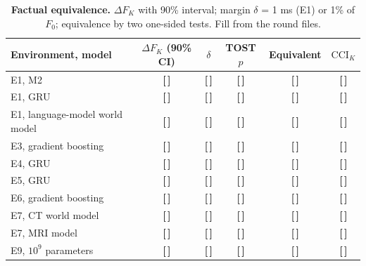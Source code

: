 \documentclass[11pt,a4paper]{article}
\newcommand{\T}{{\color{red}\textbf{[\,]}}}
\newcommand{\CCI}{\mathrm{CCI}}
\begin{document}
\begin{table}[!htbp]\centering\footnotesize
\caption{\textbf{Factual equivalence.} $\Delta F_K$ with 90\% interval; margin $\delta$ = 1 ms (E1) or 1\% of $F_0$; equivalence by two one-sided tests. Fill from the round files.}
\begin{tabularx}{\textwidth}{@{}p{3.9cm} C C C C C@{}}\toprule
Environment, model & $\Delta F_K$ (90\% CI) & $\delta$ & TOST $p$ & Equivalent & $\CCI_K$\\\midrule
E1, M2 & \T & \T & \T & \T & \T\\
E1, GRU & \T & \T & \T & \T & \T\\
E1, language-model world model & \T & \T & \T & \T & \T\\
E3, gradient boosting & \T & \T & \T & \T & \T\\
E4, GRU & \T & \T & \T & \T & \T\\
E5, GRU & \T & \T & \T & \T & \T\\
E6, gradient boosting & \T & \T & \T & \T & \T\\
E7, CT world model & \T & \T & \T & \T & \T\\
E7, MRI model & \T & \T & \T & \T & \T\\
E9, $10^9$ parameters & \T & \T & \T & \T & \T\\
\bottomrule\end{tabularx}
\end{table}
\FloatBarrier
\end{document}
